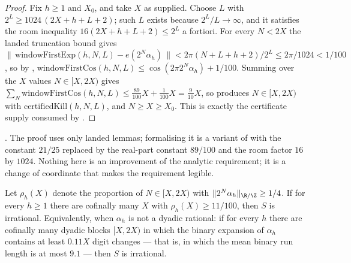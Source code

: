 \begin{proof}
Fix $h\ge 1$ and $X_0$, and take $X$ as supplied. Choose $L$ with
$2^{L}\ge 1024\,(2X+h+L+2)$; such $L$ exists because $2^L/L\to\infty$, and it
satisfies the room inequality $16(2X+h+L+2)\le 2^L$ a fortiori. For every
$N<2X$ the landed truncation bound
gives
$\bigl\|\,\mathrm{windowFirstExp}(h,N,L)-e(2^N\alpha_h)\,\bigr\|
 < 2\pi(N+L+h+2)/2^{L} \le 2\pi/1024 < 1/100$,
so by
,
$\mathrm{windowFirstCos}(h,N,L)\le \cos(2\pi 2^N\alpha_h)+1/100$. Summing over
the $X$ values $N\in[X,2X)$ gives
$\sum_N \mathrm{windowFirstCos}(h,N,L)\le \tfrac{89}{100}X+\tfrac{1}{100}X
=\tfrac{9}{10}X$, so
produces $N\in[X,2X)$ with $\mathrm{certifiedKill}(h,N,L)$, and $N\ge X\ge X_0$.
This is exactly the certificate supply consumed by
.
\end{proof}

\noindent
{} \quad {} \quad {}. The proof
uses only landed lemmas; formalising it is a variant of
with the constant $21/25$ replaced by the real-part constant $89/100$ and the
room factor $16$ by $1024$. Nothing here is an improvement of the analytic
requirement; it is a change of coordinate that makes the requirement legible.

\begin{cor}\label{cor:digitform}
Let $\rho_h(X)$ denote the proportion of $N\in[X,2X)$ with
$\|2^N\alpha_h\|_{\R/\Z}\ge 1/4$. If for every $h\ge 1$ there are cofinally
many $X$ with $\rho_h(X)\ge 11/100$, then $S$ is irrational.
Equivalently, when $\alpha_h$ is not a dyadic rational: if for every $h$
there are cofinally many dyadic blocks $[X,2X)$ in which the binary
expansion of $\alpha_h$ contains at least $0.11X$ digit changes --- that is,
in which the mean binary run length is at most $9.1$ --- then $S$ is
irrational.
\end{cor}

